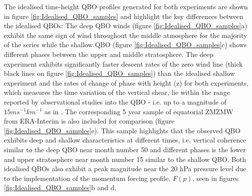 The idealised time-height QBO profiles generated for both experiments are shown in figure \ref{fig:Idealised_QBO_samples} and highlight the key differences between the idealised QBOs: The deep QBO winds (figure \ref{fig:Idealised_QBO_samples}a) exhibit the same sign of wind throughout the middle atmosphere for the majority of the series while the shallow QBO (figure \ref{fig:Idealised_QBO_samples}c) shows different phases between the upper and middle stratosphere. The deep experiment exhibits significantly faster descent rates of the zero wind line (thick black lines on figure \ref{fig:Idealised_QBO_samples}) than the idealised shallow experiment and the rates of change of phase with height (z) for both experiments, which measures the time variation of the vertical shear, lie within the range reported by observational studies into the QBO - i.e. up to a magnitude of $15ms^{-1}km^{-1}$ as in \cite{kinnersleyDescent1996}. The corresponding 5 year sample of equatorial ZMZMW from ERA-Interim is also included for comparison (figure \ref{fig:Idealised_QBO_samples}e). This sample highlights that the observed QBO exhibits deep and shallow characteristics at different times, i.e. vertical coherence similar to the deep QBO near month number 50 and different phases is the lower and upper stratosphere near month number 15 similar to the shallow QBO. Both idealised QBOs also exhibit a peak magnitude near the 20 hPa pressure level due to the implementation of the momentum forcing profile, $F(p)$, seen in figures \ref{fig:Idealised_QBO_samples}b and d. 
